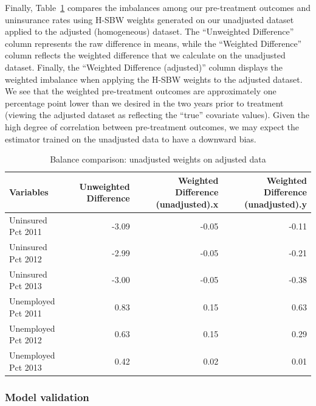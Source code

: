 Finally, Table~\ref{tab:balcomp} compares the imbalances among our pre-treatment outcomes and uninsurance rates using H-SBW weights generated on our unadjusted dataset applied to the adjusted (homogeneous) dataset. The ``Unweighted Difference'' column represents the raw difference in means, while the ``Weighted Difference'' column reflects the weighted difference that we calculate on the unadjusted dataset. Finally, the ``Weighted Difference (adjusted)'' column displays the weighted imbalance when applying the H-SBW weights to the adjusted dataset. We see that the weighted pre-treatment outcomes are approximately one percentage point lower than we desired in the two years prior to treatment (viewing the adjusted dataset as reflecting the ``true'' covariate values). Given the high degree of correlation between pre-treatment outcomes, we may expect the estimator trained on the unadjusted data to have a downward bias.

\begin{table}[ht]
\caption{Balance comparison: unadjusted weights on adjusted data}
\label{tab:balcomp}
\begin{tabular}{lrrr}
  \hline
Variables & Unweighted Difference & Weighted Difference (unadjusted).x & Weighted Difference (unadjusted).y \\ 
  \hline
Uninsured Pct 2011 & -3.09 & -0.05 & -0.11 \\ 
  Uninsured Pct 2012 & -2.99 & -0.05 & -0.21 \\ 
  Uninsured Pct 2013 & -3.00 & -0.05 & -0.38 \\ 
  Unemployed Pct 2011 & 0.83 & 0.15 & 0.63 \\ 
  Unemployed Pct 2012 & 0.63 & 0.15 & 0.29 \\ 
  Unemployed Pct 2013 & 0.42 & 0.02 & 0.01 \\ 
   \hline
\end{tabular}
\end{table}

\subsubsection{Model validation}

